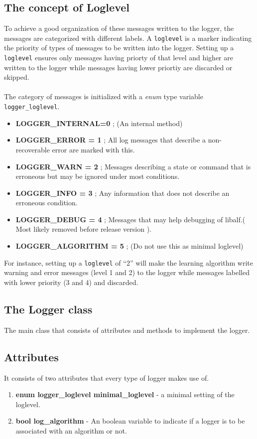\subsection{The concept of Loglevel}

To achieve a good organization of these messages written to the logger, the messages are categorized with different labels. A  \texttt{loglevel} is a marker indicating the priority of types of messages to be written into the logger. Setting up a \texttt{loglevel} ensures only messages having priorty of that level and higher are written to the logger while messages having lower priortiy are discarded or skipped.
\paragraph{}
The category of messages is initialized with a \emph{enum} type variable \texttt{logger\_loglevel}.
\begin{itemize}
 \item \textbf{LOGGER\_INTERNAL=0} ; (An internal method)
 \item \textbf{LOGGER\_ERROR = 1} ; All log messages that describe a non-recoverable error are marked with this.
 \item \textbf{LOGGER\_WARN = 2} ; Messages describing a state or command that is erroneous but may be ignored under most conditions.
 \item \textbf{LOGGER\_INFO = 3} ; Any information that does not describe an erroneous condition.
 \item \textbf{LOGGER\_DEBUG = 4} ; Messages that may help debugging of libalf.( Most likely removed before release version ).
 \item \textbf{LOGGER\_ALGORITHM = 5} ; (Do not use this as minimal loglevel)
\end{itemize}
For instance, setting up a \texttt{loglevel} of ``2'' will make the learning algorithm write warning and error messages (level 1 and 2) to the logger while messages labelled with lower priority (3 and 4) and discarded.

\subsection{The Logger class}
The main class that consists of attributes and methods to implement the logger. 

\subsection*{Attributes} 
It consists of two attributes that every type of logger makes use of.
\begin{enumerate}
 \item \textbf{enum logger\_loglevel minimal\_loglevel} - a minimal setting of the loglevel.
 \item \textbf{bool log\_algorithm} - An boolean variable to indicate if a logger is to be associated with an algorithm or not.
\end{enumerate}

